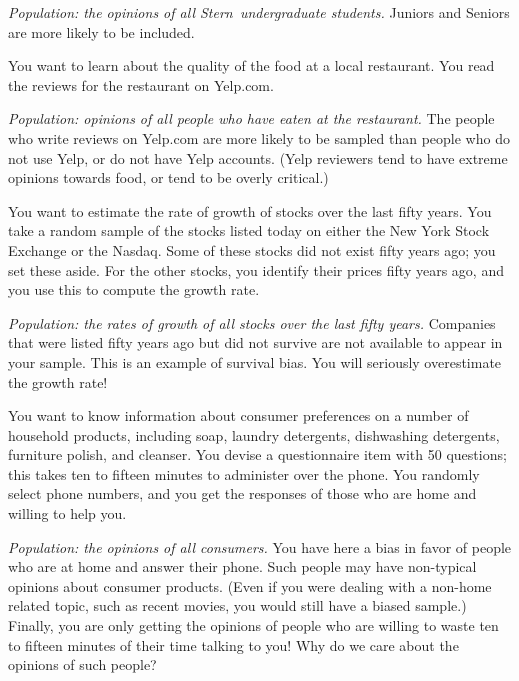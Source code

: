 \documentclass[answers,11pt]{exam}
\begin{document}
\begin{questions}
\begin{solution}
\textit{Population: the opinions of all Stern~undergraduate students.}
Juniors and Seniors are more likely to be included.
\end{solution}



\question You want to learn about the quality of the food at a local
restaurant.  You read the reviews for the restaurant on Yelp.com.

\begin{solution}
\textit{Population: opinions of all people who have eaten at the restaurant.}
The people who write reviews on Yelp.com are more likely to be sampled than
people who do not use Yelp, or do not have Yelp accounts.  (Yelp reviewers
tend to have extreme opinions towards food, or tend to be overly critical.)
\end{solution}

\newpage
\ifprintanswers\else\newpage\fi

\question You want to estimate the rate of growth of stocks over the last fifty
years.  You take a random sample of the stocks listed today on either the New
York Stock Exchange or the Nasdaq.  Some of these stocks did not exist fifty
years ago; you set these aside.  For the other stocks, you identify their
prices fifty years ago, and you use this to compute the growth rate.

\begin{solution}
\textit{Population: the rates of growth of all stocks over the last fifty
years.}
Companies that were listed fifty years ago but did not survive are not
available to appear in your sample. This is an example of survival bias. You
will seriously overestimate the growth rate!
\end{solution}


  
 \question You want to know information about consumer preferences on a number of
 household products, including soap, laundry detergents, dishwashing
 detergents, furniture polish, and cleanser.   You devise a questionnaire item
 with 50 questions;  this takes ten to fifteen minutes to administer over the
 phone.  You randomly select phone numbers, and you get the responses of those
 who are home and willing to help you.
 
 \begin{solution}
 \textit{Population: the opinions of all consumers.}
 You have here a bias in favor of people who are at home and answer their
 phone. Such people may have non-typical opinions about consumer products.
 (Even if you were dealing with a non-home related topic, such as recent
 movies, you would still have a biased sample.) Finally, you are only getting
 the opinions of people who are willing to waste ten to fifteen minutes of
 their time talking to you! Why do we care about the opinions of such people?
 \end{solution}
 

\end{questions}
\end{document}
